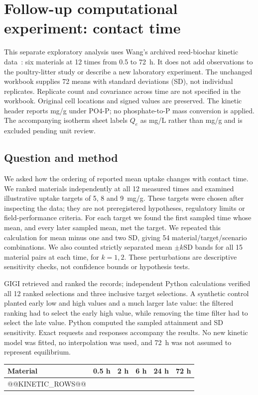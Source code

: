 \documentclass[11pt,letterpaper]{article}
\begin{document}
\section{Follow-up computational experiment: contact time}\label{app:kinetics}
This separate exploratory analysis uses Wang's archived reed-biochar kinetic data~\cite{wangdata}: six materials at 12 times from 0.5 to 72~h. It does not add observations to the poultry-litter study or describe a new laboratory experiment. The unchanged workbook supplies 72 means with standard deviations (SD), not individual replicates. Replicate count and covariance across time are not specified in the workbook. Original cell locations and signed values are preserved. The kinetic header reports mg/g under PO4-P; no phosphate-to-P mass conversion is applied. The accompanying isotherm sheet labels $Q_e$ as mg/L rather than mg/g and is excluded pending unit review.

\subsection{Question and method}
We asked how the ordering of reported mean uptake changes with contact time. We ranked materials independently at all 12 measured times and examined illustrative uptake targets of 5, 8 and 9~mg/g. These targets were chosen after inspecting the data; they are not preregistered hypotheses, regulatory limits or field-performance criteria. For each target we found the first sampled time whose mean, and every later sampled mean, met the target. We repeated this calculation for mean minus one and two SD, giving 54 material/target/scenario combinations. We also counted strictly separated mean $\pm k$SD bands for all 15 material pairs at each time, for $k=1,2$. These perturbations are descriptive sensitivity checks, not confidence bounds or hypothesis tests.

GIGI retrieved and ranked the records; independent Python calculations verified all 12 ranked selections and three inclusive target selections. A synthetic control planted early low and high values and a much larger late value: the filtered ranking had to select the early high value, while removing the time filter had to select the late value. Python computed the sampled attainment and SD sensitivity. Exact requests and responses accompany the results. No new kinetic model was fitted, no interpolation was used, and 72~h was not assumed to represent equilibrium.

\begin{center}\begin{minipage}{\textwidth}\centering\small
{}
\begin{tabular}{@{}lrrrrr@{}}\toprule
Material & 0.5 h & 2 h & 6 h & 24 h & 72 h\\\midrule
@@KINETIC_ROWS@@
\bottomrule\end{tabular}
\end{minipage}\end{center}
\end{document}

